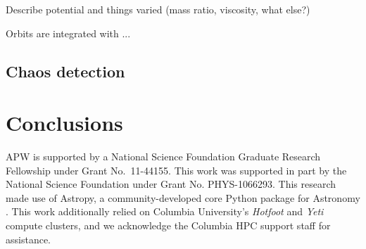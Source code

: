 \documentclass[letterpaper,12pt,preprint]{aastex}
\begin{document}
Describe potential and things varied (mass ratio, viscosity, what else?)

Orbits are integrated with ...

\subsection{Chaos detection}\label{sec:chaos}

\section{Conclusions}\label{sec:conclusions}

\acknowledgements
APW is supported by a National Science Foundation Graduate Research Fellowship under Grant No.\ 11-44155.
This work was supported in part by the National Science Foundation under Grant No. PHYS-1066293.
This research made use of Astropy, a community-developed core Python package for Astronomy \citep{astropy13}.
This work additionally relied on Columbia University's \emph{Hotfoot} and \emph{Yeti} compute clusters, and we acknowledge the Columbia HPC support staff for assistance. \\

%
%
\end{document}
